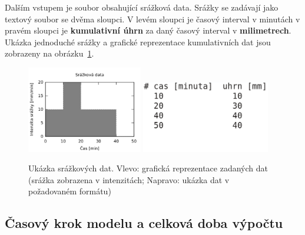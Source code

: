 Dalším vstupem je soubor obsahující srážková data. 
% 
% 
% 
Srážky se zadávají jako textový soubor se dvěma sloupci. V levém sloupci je časový interval v minutách v pravém sloupci je \textbf{kumulativní úhrn} za daný časový interval v \textbf{milimetrech}. Ukázka jednoduché srážky a grafické reprezentace kumulativních dat jsou zobrazeny na obrázku~\ref{fig:srazkovysoubor}. 
\begin{figure}
  \centering
  \includegraphics[width=0.45\textwidth]{./img/srazka-graf.png}
  \includegraphics[width=0.5\textwidth]{./img/srazka-soubor.png}
  \caption{Ukázka srážkových dat. Vlevo: grafická reprezentace zadaných dat (srážka zobrazena v intenzitách; Napravo: ukázka dat v požadovaném formátu)}
  \label{fig:srazkovysoubor}
\end{figure}














\subsection{Časový krok modelu a celková doba výpočtu} \label{sec:vstupkrok}

